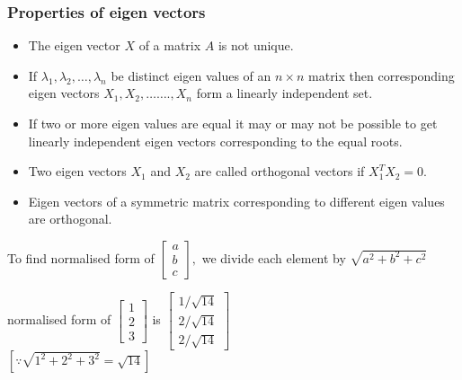 \subsubsection{Properties of eigen vectors}
\begin{itemize}
	\item The eigen vector $X$ of a matrix $A$ is not unique.
	\item  If $\lambda_{1}, \lambda_{2}, \ldots, \lambda_{n}$ be distinct eigen values of an $n \times n$ matrix then corresponding eigen vectors $X_{1}, X_{2}, \ldots \ldots ., X_{n}$ form a linearly independent set.
	\item If two or more eigen values are equal it may or may not be possible to get linearly independent eigen vectors corresponding to the equal roots.
	\item  Two eigen vectors $X_{1}$ and $X_{2}$ are called orthogonal vectors if $X_{1}^{T} X_{2}=0$.
	\item Eigen vectors of a symmetric matrix corresponding to different eigen values are orthogonal.
	
\end{itemize}
\begin{note}
	  To find normalised form of $\left[\begin{array}{l}a \\ b \\ c\end{array}\right],$ we divide each element by $\sqrt{a^{2}+b^{2}+c^{2}}$
	  \begin{exampleT}
	  	normalised form of $\left[\begin{array}{l}1 \\ 2 \\ 3\end{array}\right]$ is $\left[\begin{array}{l}1 / \sqrt{14} \\ 2 / \sqrt{14} \\ 2 / \sqrt{14}\end{array}\right]$\\$ \left[ \because \sqrt {1^{2}+2^{2}+3^{2}}=\sqrt{14}\right]$
	  \end{exampleT}
\end{note} 


